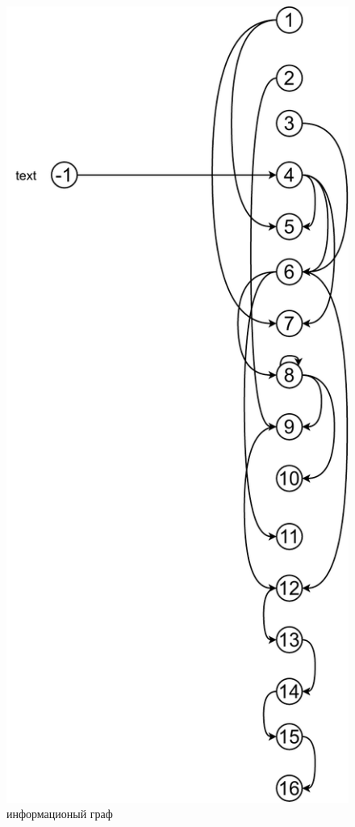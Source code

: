 \begin{figure}[h!]
	\centering
	\includegraphics[width=0.6\linewidth]{img/ig}
	\caption{информационый граф}
	\label{fig:inf_graph}
\end{figure}

